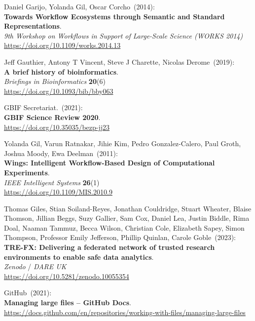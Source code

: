 \begin{thebibliography}{9}
Daniel Garijo, Yolanda Gil, Oscar Corcho~(2014): \\
\textbf{Towards Workflow Ecosystems through Semantic and Standard Representations}.\\
\emph{9th Workshop on Workflows in Support of Large-Scale Science (WORKS 2014)}\\
\url{https://doi.org/10.1109/works.2014.13} 

Jeff Gauthier, Antony T Vincent, Steve J Charette, Nicolas Derome~(2019): \\
\textbf{A brief history of bioinformatics}.\\
\emph{Briefings in Bioinformatics} \textbf{20}(6)\\
\url{https://doi.org/10.1093/bib/bby063}

GBIF Secretariat.~(2021): \\
\textbf{GBIF Science Review 2020}.\\
\url{https://doi.org/10.35035/bezp-jj23}

Yolanda Gil, Varun Ratnakar, Jihie Kim, Pedro Gonzalez-Calero, Paul Groth, Joshua Moody, Ewa Deelman~(2011): \\
\textbf{Wings: Intelligent Workflow-Based Design of Computational Experiments}.\\
\emph{IEEE Intelligent Systems} \textbf{26}(1) \\
\url{https://doi.org/10.1109/MIS.2010.9}

Thomas Giles, Stian Soiland-Reyes, Jonathan Couldridge, Stuart Wheater, Blaise Thomson, Jillian Beggs, Suzy Gallier, Sam Cox, Daniel Lea, Justin Biddle, Rima Doal, Naaman Tammuz, Becca Wilson, Christian Cole, Elizabeth Sapey, Simon Thompson, Professor Emily Jefferson, Phillip Quinlan, Carole Goble~(2023): \\
\textbf{TRE-FX: Delivering a federated network of trusted research environments to enable safe data analytics}.\\
\emph{Zenodo} / \emph{DARE UK} \\
\url{https://doi.org/10.5281/zenodo.10055354}

GitHub~(2021): \\
\textbf{Managing large files -- GitHub Docs}.\\
\url{https://docs.github.com/en/repositories/working-with-files/managing-large-files}


\end{thebibliography}
